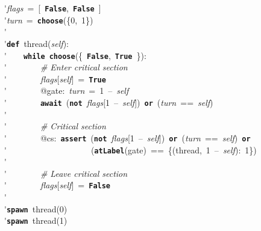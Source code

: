 \'\>\textit{flags}~=~[~\texttt{\textbf{False}},~\texttt{\textbf{False}}~]\\

\'\>\textit{turn}~=~\texttt{\textbf{choose}}(\{0,~1\})\\

\'\>\\

\'\>\texttt{\textbf{def}}~thread(\textit{self}):\\

\'\>~~~~\texttt{\textbf{while}}~\texttt{\textbf{choose}}(\{~\texttt{\textbf{False}},~\texttt{\textbf{True}}~\}):\\

\'\>~~~~~~~~\emph{\# Enter critical section}\\

\'\>~~~~~~~~\textit{flags}[\textit{self}]~=~\texttt{\textbf{True}}\\

\'\>~~~~~~~~@gate:~\textit{turn}~=~1~--~\textit{self}\\

\'\>~~~~~~~~\texttt{\textbf{await}}~(\texttt{\textbf{not}}~\textit{flags}[1~--~\textit{self}])~\texttt{\textbf{or}}~(\textit{turn}~==~\textit{self})\\

\'\>\\

\'\>~~~~~~~~\emph{\# Critical section}\\

\'\>~~~~~~~~@cs:~\texttt{\textbf{assert}}~(\texttt{\textbf{not}}~\textit{flags}[1~--~\textit{self}])~\texttt{\textbf{or}}~(\textit{turn}~==~\textit{self})~\texttt{\textbf{or}}\\

\'\>~~~~~~~~~~~~~~~~~~~~(\texttt{\textbf{atLabel}}(gate)~==~\{(thread,~1~--~\textit{self}):~1\})\\

\'\>\\

\'\>~~~~~~~~\emph{\# Leave critical section}\\

\'\>~~~~~~~~\textit{flags}[\textit{self}]~=~\texttt{\textbf{False}}\\

\'\>\\

\'\>\texttt{\textbf{spawn}}~thread(0)\\

\'\>\texttt{\textbf{spawn}}~thread(1)